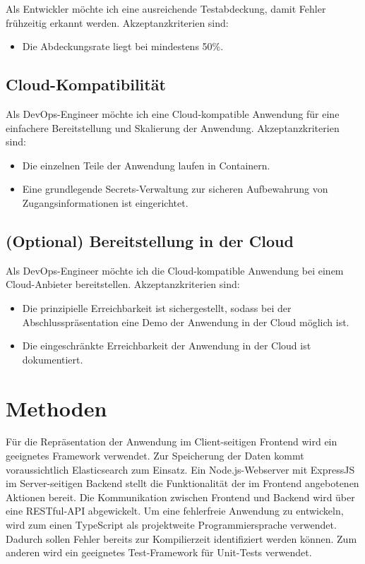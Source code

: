 \documentclass[a4paper, 10pt, conference]{ieeeconf}
\begin{document}
Als Entwickler möchte ich eine ausreichende Testabdeckung, damit Fehler frühzeitig erkannt werden.  Akzeptanzkriterien sind:
\begin{itemize}
\item Die Abdeckungsrate liegt bei mindestens 50\%.
\end{itemize}

\subsection{Cloud-Kompatibilität}

Als DevOps-Engineer möchte ich eine Cloud-kompatible Anwendung für eine einfachere Bereitstellung und Skalierung der Anwendung. Akzeptanzkriterien sind:
\begin{itemize}
\item Die einzelnen Teile der Anwendung laufen in Containern.
\item Eine grundlegende Secrets-Verwaltung zur sicheren Aufbewahrung von Zugangsinformationen ist eingerichtet.
\end{itemize}

\subsection{(Optional) Bereitstellung in der Cloud}

Als DevOps-Engineer möchte ich die Cloud-kompatible Anwendung bei einem Cloud-Anbieter bereitstellen.  Akzeptanzkriterien sind:
\begin{itemize}
\item Die prinzipielle Erreichbarkeit ist sichergestellt, sodass bei der Abschlusspräsentation eine Demo der Anwendung in der Cloud möglich ist.
\item Die eingeschränkte Erreichbarkeit der Anwendung in der Cloud ist dokumentiert.
\end{itemize}


\section{Methoden} \label{s:methoden}

Für die Repräsentation der Anwendung im Client-seitigen Frontend wird ein geeignetes Framework verwendet. Zur Speicherung der Daten kommt voraussichtlich Elasticsearch zum Einsatz. Ein Node.js-Webserver mit ExpressJS im Server-seitigen Backend stellt die Funktionalität der im Frontend angebotenen Aktionen bereit. Die Kommunikation zwischen Frontend und Backend wird über eine RESTful-API abgewickelt. Um eine fehlerfreie Anwendung zu entwickeln, wird zum einen TypeScript als projektweite Programmiersprache verwendet. Dadurch sollen Fehler bereits zur Kompilierzeit identifiziert werden können. Zum anderen wird ein geeignetes Test-Framework für Unit-Tests verwendet.

\printbibliography
\end{document}
